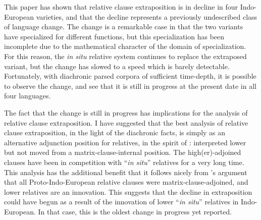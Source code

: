 This paper has shown that relative clause extraposition is in decline in four Indo-European varieties, and that the decline represents a previously undescribed class of language change. The change is a remarkable case in that the two variants have specialized for different functions, but this specialization has been incomplete due to the mathematical character of the domain of specialization. For this reason, the \textsl{in situ} relative system continues to replace the extraposed variant, but the change has slowed to a speed which is barely detectable. Fortunately, with diachronic parsed corpora of sufficient time-depth, it is possible to observe the change, and see that it is still in progress at the present date in all four languages.

The fact that the change is still in progress has implications for the analysis of relative clause extraposition. I have suggested that the best analysis of relative clause extraposition, in the light of the diachronic facts, is simply as an alternative adjunction position for relatives, in the spirit of \citet{culicoverrochemont1990}: interpreted lower but not moved from a matrix-clause-internal position. The high(er)-adjoined clauses have been in competition with ``\textsl{in situ}'' relatives for a very long time. This analysis has the additional benefit that it follows nicely from \citet{kiparsky1995}'s argument that all Proto-Indo-European relative clauses were matrix-clause-adjoined, and lower relatives are an innovation. This suggests that the decline in extraposition could have begun as a result of the innovation of lower ``\textsl{in situ}'' relatives in Indo-European. In that case, this is the oldest change in progress yet reported.







%
%


